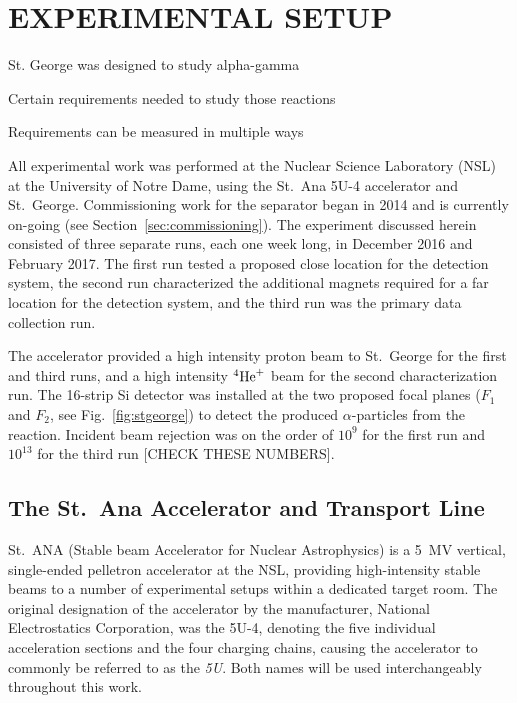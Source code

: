 \chapter{EXPERIMENTAL SETUP}
\label{ch:02-experimental-setup}


St. George was designed to study alpha-gamma

Certain requirements needed to study those reactions

Requirements can be measured in multiple ways



All experimental work was performed at the Nuclear Science Laboratory (NSL) at
the University of Notre Dame, using the St.\ Ana 5U-4 accelerator and
St.\ George. Commissioning work for the separator began in 2014 and is
currently on-going (see Section~\ref{sec:commissioning}). The experiment discussed
herein consisted of three separate runs, each one week long, in December 2016
and February 2017. The first run tested a proposed close location for the
detection system, the second run characterized the additional magnets required
for a far location for the detection system, and the third run was the primary
data collection run.

The accelerator provided a high intensity proton beam to St.\ George for the
first and third runs, and a high intensity ${}^{4}\textrm{He}^{+}$ beam for the
second characterization run. The 16-strip Si detector was installed at the two
proposed focal planes ($F_1$ and $F_2$, see Fig.~\ref{fig:stgeorge}) to detect
the produced $\alpha$-particles from the \alpa{} reaction. Incident beam
rejection was on the order of $10^9$ for the first run and $10^{13}$ for the
third run [CHECK THESE NUMBERS].


\section{The St.\ Ana Accelerator and Transport Line}
\label{sec:ch02-5U}

St.\ ANA (Stable beam Accelerator for Nuclear Astrophysics) is a 5~MV vertical,
single-ended pelletron accelerator at the NSL, providing high-intensity stable
beams to a number of experimental setups within a dedicated target room. The
original designation of the accelerator by the manufacturer, National
Electrostatics Corporation, was the 5U-4, denoting the five individual
acceleration sections and the four charging chains, causing the accelerator to
commonly be referred to as the \textit{5U}. Both names will be used
interchangeably throughout this work.


